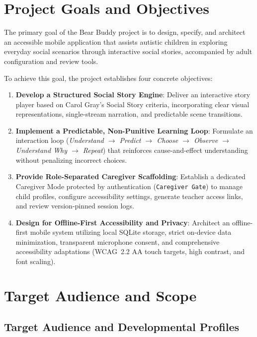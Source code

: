 \section{Project Goals and Objectives}

The primary goal of the Bear Buddy project is to design, specify, and architect an accessible mobile application that assists autistic children in exploring everyday social scenarios through interactive social stories, accompanied by adult configuration and review tools.

To achieve this goal, the project establishes four concrete objectives:
\begin{enumerate}
    \item \textbf{Develop a Structured Social Story Engine}: Deliver an interactive story player based on Carol Gray's Social Story criteria, incorporating clear visual representations, single-stream narration, and predictable scene transitions.
    \item \textbf{Implement a Predictable, Non-Punitive Learning Loop}: Formulate an interaction loop (\textit{Understand $\rightarrow$ Predict $\rightarrow$ Choose $\rightarrow$ Observe $\rightarrow$ Understand Why $\rightarrow$ Repeat}) that reinforces cause-and-effect understanding without penalizing incorrect choices.
    \item \textbf{Provide Role-Separated Caregiver Scaffolding}: Establish a dedicated Caregiver Mode protected by authentication (\texttt{Caregiver Gate}) to manage child profiles, configure accessibility settings, generate teacher access links, and review version-pinned session logs.
    \item \textbf{Design for Offline-First Accessibility and Privacy}: Architect an offline-first mobile system utilizing local SQLite storage, strict on-device data minimization, transparent microphone consent, and comprehensive accessibility adaptations (WCAG~2.2 AA touch targets, high contrast, and font scaling).
\end{enumerate}

\section{Target Audience and Scope}

\subsection{Target Audience and Developmental Profiles}

